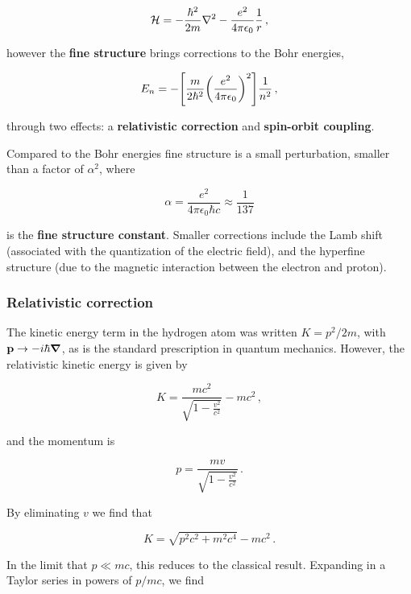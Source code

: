\documentclass[12pt, titlepage]{article}
\begin{document}
\begin{equation}
	\mathcal{H} = -\frac{\hbar^2}{2m}\laplacian{} - \frac{e^2}{4\pi\epsilon_0}\frac{1}{r} \,,
\end{equation}
 
however the \textbf{fine structure} brings corrections to the Bohr energies,

\begin{equation}
	E_n = -\qty[\frac{m}{2\hbar^2}\qty(\frac{e^2}{4\pi\epsilon_0})^2]\frac{1}{n^2} \,,
\end{equation}

through two effects: a \textbf{relativistic correction} and \textbf{spin-orbit coupling}. 

Compared to the Bohr energies fine structure is a small perturbation, smaller than a factor of $\alpha^2$, where

\begin{equation}
	\alpha = \frac{e^2}{4\pi\epsilon_0\hbar c} \approx \frac{1}{137}
\end{equation}

is the \textbf{fine structure constant}. Smaller corrections include the Lamb shift (associated with the quantization of the electric field), and the hyperfine structure (due to the magnetic interaction between the electron and proton).

\subsubsection{Relativistic correction}
The kinetic energy term in the hydrogen atom was written $K = p^2/2m$, with $\vb{p}\rightarrow -i\hbar\grad{}$, as is the standard prescription in quantum mechanics. However, the relativistic kinetic energy is given by

\begin{equation}
	K = \frac{mc^2}{\sqrt{1-\frac{v^2}{c^2}}} - mc^2 \,,
\end{equation}

and the momentum is

\begin{equation}
	p = \frac{mv}{\sqrt{1-\frac{v^2}{c^2}}} \,.
\end{equation}

By eliminating $v$ we find that

\begin{equation}
	K = \sqrt{p^2c^2 + m^2c^4} - mc^2 \,.
\end{equation}

In the limit that $p \ll mc$, this reduces to the classical result. Expanding in a Taylor series in powers of $p/mc$, we find 
\end{document}
